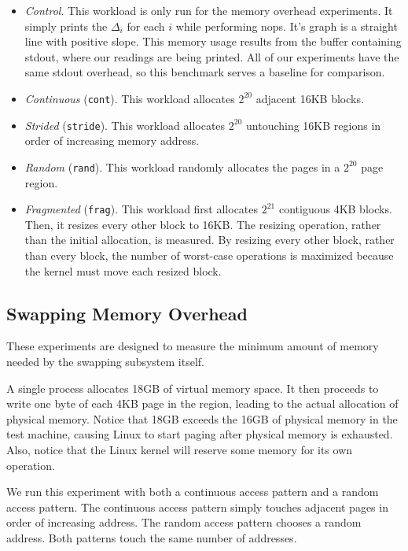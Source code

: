 \documentclass[twocolumn,11pt]{article}
\begin{document}
\begin{itemize} \item \textit{Control}. This workload is only run for the memory
overhead experiments. It simply prints the $\Delta_i$ for each $i$ while performing nops. It's graph
is a straight line with positive slope. This memory usage results from the
buffer containing stdout, where our readings are being printed. All of our
experiments have the same stdout overhead, so this benchmark serves a baseline
for comparison.

\item \textit{Continuous} (\texttt{cont}). This workload allocates $2^{20}$
adjacent 16KB blocks.

\item \textit{Strided} (\texttt{stride}). This workload allocates $2^{20}$ untouching 16KB regions
in order of increasing memory address.

\item \textit{Random} (\texttt{rand}). This workload randomly allocates the pages in a
$2^{20}$ page region.

\item \textit{Fragmented} (\texttt{frag}). This workload first allocates
    $2^{21}$ contiguous 4KB blocks. Then, it resizes every other block to 16KB.
        The resizing operation, rather than the initial allocation, is measured.
        By resizing every other block, rather than every block, the number of
        worst-case operations is maximized because the kernel must move each
        resized block.
\end{itemize}

\subsection{Swapping Memory Overhead}
\label{swapping_memory_overhead}

These experiments are designed to measure the minimum amount of memory needed
by the swapping subsystem itself.

A single process allocates 18GB of virtual memory space. It then proceeds to
write one byte of each 4KB page in the region, leading to the actual allocation
of physical memory. Notice that 18GB exceeds the 16GB of physical memory in the
test machine, causing Linux to start paging after physical memory is exhausted.
Also, notice that the Linux kernel will reserve some memory for its own
operation.

We run this experiment with both a continuous access pattern and a random access
pattern. The continuous access pattern simply touches adjacent pages in order of
increasing address. The random access pattern chooses a random address. Both
patterns touch the same number of addresses.
\end{document}
